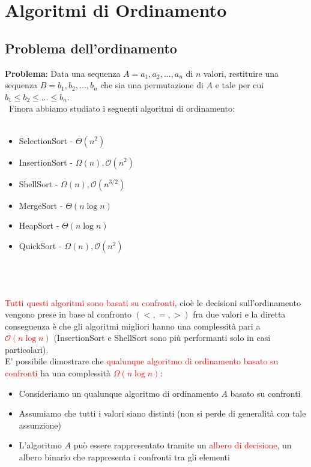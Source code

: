 \documentclass[../cheatSheetAlgoritmi.tex]{subfiles}
\begin{document}
\section{Algoritmi di Ordinamento}
\subsection{Problema dell'ordinamento}
\textbf{Problema}: Data una sequenza $A = a_1, a_2 , ..., a_n$ di $n$ valori, restituire una sequenza $B = b_1 , b_2 , ..., b_n$ che sia una permutazione di $A$ e tale per cui $b_1 \leq b_2 \leq ... \leq b_n$.\\\
Finora abbiamo studiato i seguenti algoritmi di ordinamento:\\\\
\noindent\begin{minipage}{0.5\textwidth}
\begin{itemize}
	\item SelectionSort - $\Theta(n^{2})$
	\item InsertionSort - $\Omega(n), \mathcal{O}(n^{2})$
	\item ShellSort - $\Omega(n), \mathcal{O}(n^{3/2})$
\end{itemize}
\end{minipage}
\hfill
\begin{minipage}{0.5\textwidth}\raggedleft
\begin{itemize}
	\item MergeSort - $\Theta(n \log n)$
	\item HeapSort - $\Theta(n \log n)$
	\item QuickSort - $\Omega(n), \mathcal{O}(n^{2})$
\end{itemize}
\end{minipage} \\\\\\
\textcolor{red}{Tutti questi algoritmi sono basati su confronti}, cioè le decisioni sull'ordinamento vengono prese in base al confronto $(<, =, >)$ fra due valori e la diretta conseguenza è che gli algoritmi migliori hanno una complessità pari a \textcolor{red}{$\mathcal{O}(n \log n)$} (InsertionSort e ShellSort sono più performanti solo in casi particolari).\\
E' possibile dimostrare che \textcolor{red}{qualunque algoritmo di ordinamento basato su confronti} ha una complessità \textcolor{red}{$\Omega(n \log n)$}:
\begin{itemize}
	\item Consideriamo un qualunque algoritmo di ordinamento $A$ basato su confronti
	\item Assumiamo che tutti i valori siano distinti (non si perde di generalità con tale assunzione)
	\item L'algoritmo $A$ può essere rappresentato tramite un \textcolor{red}{albero di decisione}, un albero binario che rappresenta i confronti tra gli elementi
\end{itemize}
\end{document}

